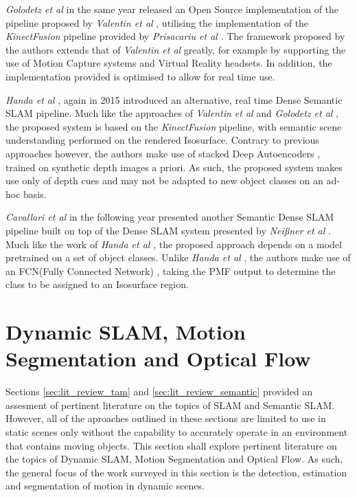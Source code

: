 \textit{Golodetz et al} \cite{Golodetz2015} in the same year released an Open Source 
implementation of the pipeline proposed by \textit{Valentin et al} \cite{Valentin2015}, 
utilising the implementation of the \textit{KinectFusion} \cite{Newcombe2011} pipeline 
provided by \textit{Prisacariu et al} \cite{Prisacariu2014}. The framework proposed by 
the authors extends that of \textit{Valentin et al} \cite{Valentin2015} greatly, for 
example by supporting the use of Motion Capture systems and Virtual Reality headsets. 
In addition, the implementation provided is optimised to allow for real time use.

\textit{Handa et al} \cite{Handa2015}, again in 2015 introduced an alternative, 
real time Dense Semantic SLAM pipeline. Much like the approaches of \textit{Valentin et al} 
\cite{Valentin2015} and \textit{Golodetz et al} \cite{Golodetz2015}, the proposed system 
is based on the \textit{KinectFusion} \cite{Newcombe2011} pipeline, with semantic scene 
understanding performed on the rendered Isosurface. Contrary to previous approaches however, 
the authors make use of stacked Deep Autoencoders \cite{DAA}, trained on synthetic depth 
images a priori. As such, the proposed system makes use only of depth cues and may not be 
adapted to new object classes on an ad-hoc basis.

\textit{Cavallari et al} \cite{Cavallari2016} in the following year presented another 
Semantic Dense SLAM pipeline built on top of the Dense SLAM system presented by 
\textit{Nei{\ss}ner et al} \cite{NieBner2013}. Much like the work of \textit{Handa et al} 
\cite{Handa2015}, the proposed approach depends on a model pretrained on a set of object 
classes. Unlike \textit{Handa et al} \cite{Handa2015}, the authors make use of an 
FCN(Fully Connected Network) \cite{FCN}, taking the PMF output to determine the class 
to be assigned to an Isosurface region.

\section{Dynamic SLAM, Motion Segmentation and Optical Flow}
\label{sec:lit_review_dynamic}
Sections \ref{sec:lit_review_tam} and \ref{sec:lit_review_semantic} provided an assesment 
of pertinent literature on the topics of SLAM and Semantic SLAM. However, all of the 
aproaches outlined in these sections are limited to use in static scenes only without 
the capability to accurately operate in an environment that contains moving objects. This 
section shall explore pertinent literature on the topics of Dynamic SLAM, Motion Segmentation 
and Optical Flow. As such, the general focus of the work surveyed in this section is the 
detection, estimation and segmentation of motion in dynamic scenes.

